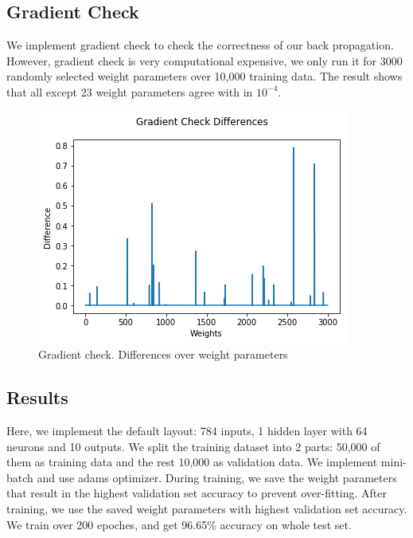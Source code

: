 \documentclass{article}
\begin{document}
\subsection{Gradient Check}
We implement gradient check to check the correctness of our back propagation. However, gradient check is very computational expensive, we only run it for 3000 randomly selected weight parameters over 10,000 training data. The result shows that all except 23 weight parameters agree with in $10^{-4}$.
\begin{figure}[h]
	\begin{minipage}{0.6\textwidth}
		\centering
		\includegraphics[width=\textwidth]{pics/gradient_check.png}
		\caption{Gradient check. Differences over weight parameters}
	\end{minipage}\hfill
\end{figure}

\subsection{Results}
Here, we implement the default layout: 784 inputs, 1 hidden layer with 64 neurons and 10 outputs. We split the training dataset into 2 parts: 50,000 of them as training data and the rest 10,000 as validation data. We implement mini-batch and use adams optimizer. During training, we save the weight parameters that result in the highest validation set accuracy to prevent over-fitting. After training, we use the saved weight parameters with highest validation set accuracy. We train over 200 epoches, and get 96.65\% accuracy on whole test set.
\end{document}

